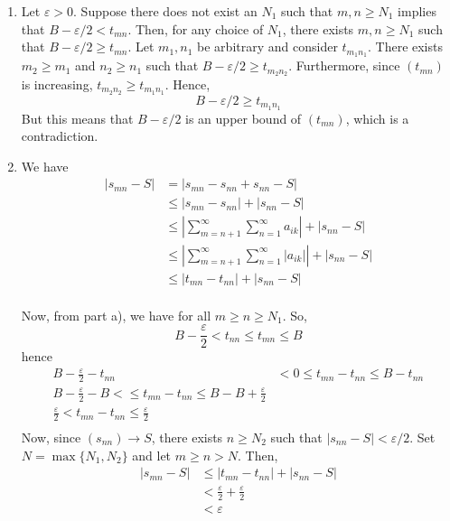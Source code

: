\documentclass[a4paper]{report}
\newenvironment{ex}[1]
    {\noindent{\large \bf Exercise #1.}}{\vspace{0.5cm}}
\begin{document}
\begin{ex}{2.8.4}
  \begin{enumerate}[label=\alph*)]
  \item Let $\varepsilon > 0$. Suppose there does not exist an $N_1$
    such that $m, n \geq N_1$ implies that $B - \varepsilon/2 <
    t_{mn}$. Then, for any choice of $N_1$, there exists $m, n \geq
    N_1$ such that $B - \varepsilon/2 \geq t_{mn}$. Let $m_1, n_1$ be
    arbitrary and consider $t_{m_1n_1}$. There exists $m_2 \geq m_1$
    and $n_2 \geq n_1$ such that $B -\varepsilon/2 \geq t_{m_2n_2}$.
    Furthermore, since $(t_{mn})$ is increasing, $t_{m_2n_2} \geq t_{m_1n_1}$.
    Hence,
    \[
       B-\varepsilon/2 \geq t_{m_1n_1}
       \]
       But this means that $B -\varepsilon/2$ is an upper bound of $(t_{mn})$, which
       is a contradiction.
     \item We have
       \begin{align*}
         | s_{mn} - S | &= | s_{mn} - s_{nn} + s_{nn} - S| \\
         &\leq | s_{mn} - s_{nn} | + | s_{nn} - S| \\
         &\leq \left| \sum_{m=n+1}^{\infty} \sum_{n=1}^{\infty} a_{ik} \right| + |s_{nn} - S| \\ \tag{assuming $m \geq n$}
         &\leq \left| \sum_{m=n+1}^{\infty} \sum_{n=1}^{\infty} |a_{ik}| \right| + |s_{nn} - S| \\
         &\leq \left| t_{mn} - t_{nn} \right| + |s_{nn} - S| \\
       \end{align*}

       Now, from part a), we have for all $m \geq n \geq N_1$. So,
       \[
         B - \frac{\varepsilon}{2} < t_{nn} \leq t_{mn} \leq B
         \]
         hence
       \begin{align*}
         B - \frac{\varepsilon}{2} - t_{nn} &< 0 \leq t_{mn} - t_{nn} \leq B - t_{nn} \\
         B - \frac{\varepsilon}{2} - B < \leq t_{mn} - t_{nn} \leq B - B + \frac{\varepsilon}{2} \\
         \frac{\varepsilon}{2}  < t_{mn} - t_{nn} \leq  \frac{\varepsilon}{2} \\
       \end{align*}
       Now, since $(s_{nn}) \rightarrow S$, there exists $n \geq N_2$ such that $|s_{nn} - S| < \varepsilon/2$.
       Set $N = \max\{N_1, N_2\}$ and let $m \geq n > N$. Then,
       \begin{align*}
         | s_{mn} - S | &\leq \left| t_{mn} - t_{nn} \right| + |s_{nn} - S| \\
         &< \frac{\varepsilon}{2} + \frac{\varepsilon}{2} \\
         &< \varepsilon
       \end{align*}
  \end{enumerate}
\end{ex}
\end{document}
